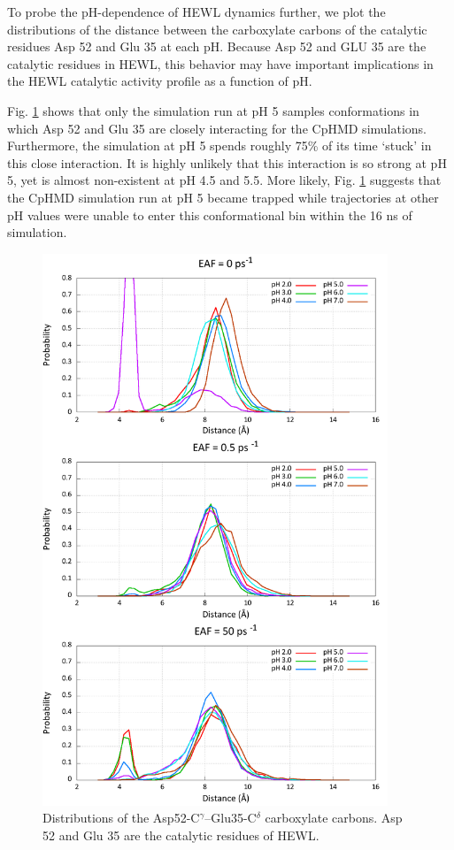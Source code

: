To probe the pH-dependence of HEWL dynamics further, we plot the distributions
of the distance between the carboxylate carbons of the catalytic residues Asp 52
and Glu 35 at each pH.  Because Asp 52 and GLU 35 are the catalytic residues in
HEWL, this behavior may have important implications in the HEWL catalytic
activity profile as a function of pH.

Fig. \ref{fig3:cat_dist} shows that only the simulation run at pH 5 samples
conformations in which Asp 52 and Glu 35 are closely interacting for the CpHMD
simulations.  Furthermore, the simulation at pH 5 spends roughly 75\% of its
time `stuck' in this close interaction.  It is highly unlikely that this
interaction is so strong at pH 5, yet is almost non-existent at pH 4.5 and 5.5.
More likely, Fig. \ref{fig3:cat_dist} suggests that the CpHMD simulation run at
pH 5 became trapped while trajectories at other pH values were unable to enter
this conformational bin within the 16 ns of simulation.

\begin{figure}
 \includegraphics[width=4.06in, height=6.5in]{Catalytic_Distances.png}
 \caption{Distributions of the Asp52-C$^\gamma$--Glu35-C$^\delta$ carboxylate
          carbons. Asp 52 and Glu 35 are the catalytic residues of HEWL.}
 \label{fig3:cat_dist}
\end{figure}

